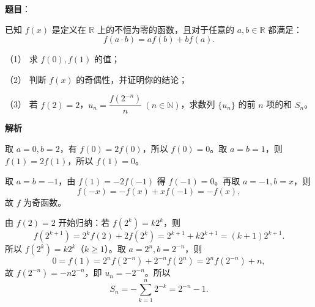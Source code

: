 \begin{answer}

\textbf{题目}：

已知 \(f(x)\) 是定义在 \(\mathbb R\) 上的不恒为零的函数，且对于任意的 \(a,b\in\mathbb R\) 都满足：
\nopagebreak[4]
\[
f(a\cdot b)=af(b)+bf(a).
\]

（1） 求 \(f(0),f(1)\) 的值；

（2） 判断 \(f(x)\) 的奇偶性，并证明你的结论；

（3） 若 \(f(2)=2\)，\(u_n=\dfrac{f(2^{-n})}{n}\ (n\in\mathbb N)\)，求数列 \(\{u_n\}\) 的前 \(n\) 项的和 \(S_n\)。

\textbf{解析}


取 \(a=0,b=2\)，有 \(f(0)=2f(0)\)，所以 \(f(0)=0\)。取 \(a=b=1\)，则 \(f(1)=2f(1)\)，所以 \(f(1)=0\)。


取 \(a=b=-1\)，由 \(f(1)=-2f(-1)\) 得 \(f(-1)=0\)。再取 \(a=-1,b=x\)，则
\nopagebreak[4]
\[
f(-x)=-f(x)+xf(-1)=-f(x),
\]
故 \(f\) 为奇函数。


由 \(f(2)=2\) 开始归纳：若 \(f(2^k)=k2^k\)，则
\nopagebreak[4]
\[
f(2^{k+1})=2^k f(2)+2f(2^k)=2^{k+1}+k2^{k+1}=(k+1)2^{k+1}.
\]
所以 \(f(2^k)=k2^k\)（\(k\geqslant1\)）。取 \(a=2^n,b=2^{-n}\)，则
\nopagebreak[4]
\[
0=f(1)=2^nf(2^{-n})+2^{-n}f(2^n)
=2^nf(2^{-n})+n,
\]
故 \(f(2^{-n})=-n2^{-n}\)，即 \(u_n=-2^{-n}\)。所以
\nopagebreak[4]
\[
S_n=-\sum_{k=1}^{n}2^{-k}=2^{-n}-1.
\]




\end{answer}